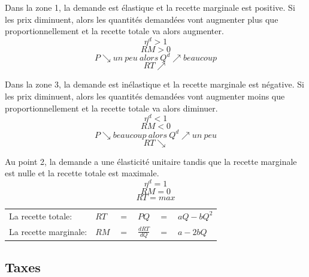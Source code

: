 \begin{minipage}{0.6\textwidth}
    Dans la zone 1, la demande est \textcolor[rgb]{1,0,0}{élastique} et la recette marginale est \textcolor[rgb]{1,0,0}{positive}.
		Si les prix diminuent, alors les quantités demandées vont \textcolor[rgb]{1,0,0}{augmenter plus} que proportionnellement et la recette totale va alors \textcolor[rgb]{1,0,0}{augmenter}.
		$$\eta^d > 1$$
		$$RM > 0$$
		$$P \searrow un\ peu\ alors\ Q^d \nearrow beaucoup$$
		$$RT \nearrow$$

		Dans la zone 3, la demande est \textcolor[rgb]{1,0,0}{inélastique} et la recette marginale est \textcolor[rgb]{1,0,0}{négative}.
		Si les prix diminuent, alors les quantités demandées vont \textcolor[rgb]{1,0,0}{augmenter} moins que proportionnellement et la recette totale va alors \textcolor[rgb]{1,0,0}{diminuer}.
		$$\eta^d < 1$$
		$$RM < 0$$
		$$P \searrow beaucoup\ alors\ Q^d \nearrow un\ peu$$
		$$RT \searrow$$

		Au point 2, la demande a une élasticité unitaire tandis que la recette marginale est nulle et la recette totale est maximale.
		$$\eta^d = 1$$
		$$RM = 0$$
		$$RT = max$$
    
    \begin{tabular}{llllll}
        La recette totale:    & $RT$ & $=$ & $PQ$ & $=$ & $aQ - bQ^2$\\
        La recette marginale: & $RM$ & $=$ & $\frac{dRT}{dQ}$ & $=$ & $a - 2bQ$\\
    \end{tabular}
\end{minipage}



\subsection{Taxes}



